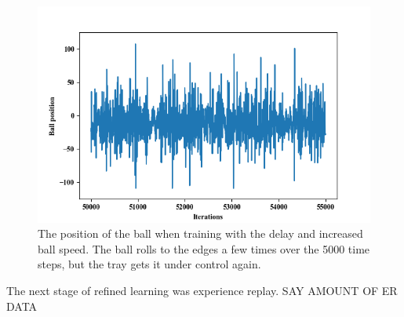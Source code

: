 \documentclass[12pt,a4paper]{article}
\begin{document}
\begin{figure}[H]
	\includegraphics{195}
	\caption{The position of the ball when training with the delay and increased ball speed. The ball rolls to the edges a few times over the 5000 time steps, but the tray gets it under control again. }
	\label{refined_sim_general}
\end{figure}

The next stage of refined learning was experience replay. SAY AMOUNT OF ER DATA
\end{document}
